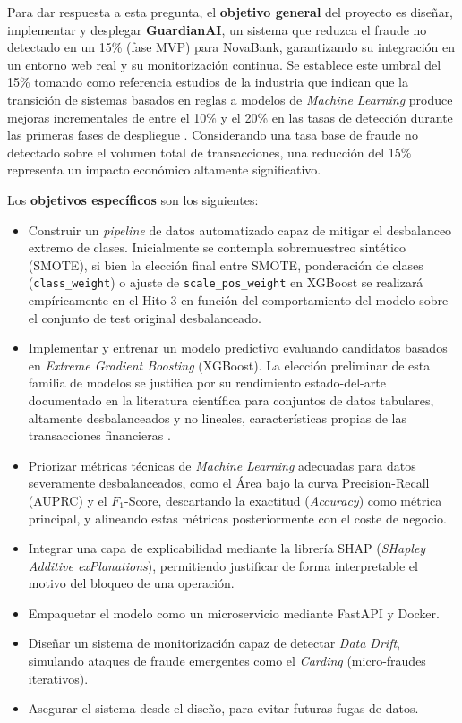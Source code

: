 \documentclass[12pt,a4paper]{report}
\begin{document}
Para dar respuesta a esta pregunta, el \textbf{objetivo general} del proyecto es diseñar, implementar y desplegar \textbf{GuardianAI}, un sistema que reduzca el fraude no detectado en un 15\% (fase MVP) para NovaBank, garantizando su integración en un entorno web real y su monitorización continua. Se establece este umbral del 15\% tomando como referencia estudios de la industria que indican que la transición de sistemas basados en reglas a modelos de \textit{Machine Learning} produce mejoras incrementales de entre el 10\% y el 20\% en las tasas de detección durante las primeras fases de despliegue \cite{dalpozz2017credit}. Considerando una tasa base de fraude no detectado sobre el volumen total de transacciones, una reducción del 15\% representa un impacto económico altamente significativo.

Los \textbf{objetivos específicos} son los siguientes:
\begin{itemize}
    \item Construir un \textit{pipeline} de datos automatizado capaz de mitigar el desbalanceo extremo de clases. Inicialmente se contempla sobremuestreo sintético (SMOTE), si bien la elección final entre SMOTE, ponderación de clases (\texttt{class\_weight}) o ajuste de \texttt{scale\_pos\_weight} en XGBoost se realizará empíricamente en el Hito 3 en función del comportamiento del modelo sobre el conjunto de test original desbalanceado.
    \item Implementar y entrenar un modelo predictivo evaluando candidatos basados en \textit{Extreme Gradient Boosting} (XGBoost). La elección preliminar de esta familia de modelos se justifica por su rendimiento estado-del-arte documentado en la literatura científica para conjuntos de datos tabulares, altamente desbalanceados y no lineales, características propias de las transacciones financieras \cite{dalpozz2017credit}.
    \item Priorizar métricas técnicas de \textit{Machine Learning} adecuadas para datos severamente desbalanceados, como el Área bajo la curva Precision-Recall (AUPRC) y el $F_1$-Score, descartando la exactitud (\textit{Accuracy}) como métrica principal, y alineando estas métricas posteriormente con el coste de negocio.
    \item Integrar una capa de explicabilidad mediante la librería SHAP (\textit{SHapley Additive exPlanations}), permitiendo justificar de forma interpretable el motivo del bloqueo de una operación.
    \item Empaquetar el modelo como un microservicio mediante FastAPI y Docker.
    \item Diseñar un sistema de monitorización capaz de detectar \textit{Data Drift}, simulando ataques de fraude emergentes como el \textit{Carding} (micro-fraudes iterativos).
    \item Asegurar el sistema desde el diseño, para evitar futuras fugas de datos.
\end{itemize}
\end{document}
